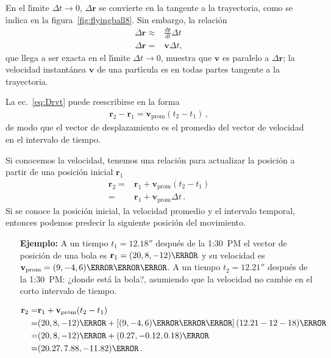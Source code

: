 En el l\'\i mite $\Delta t\to0$, $\Delta\mathbf{r}$ se convierte en la tangente a la trayectoria, como se \'\i ndica en la figura~\ref{fig:flyingball8}. Sin embargo, la relaci\'on
\begin{align}
  \label{eq:Drvt}
  \Delta\mathbf{r}\approx&\frac{d\mathbf{r}}{dt}\Delta t\nonumber\\
  \Delta\mathbf{r}=&\mathbf{v}\Delta t,
\end{align}
que llega a ser exacta en el l\'\i mite $\Delta t\to 0$, muestra que $\mathbf{v}$ es paralelo a $\Delta\mathbf{r}$; la velocidad instant\'anea $\mathbf{v}$ de una part\'\i cula es en todas partes tangente a la trayectoria. 


La ec.~\eqref{eq:Drvt} puede reescribirse en la forma
\begin{align*}
  \mathbf{r}_2-\mathbf{r}_1=\mathbf{v}_{\text{prom}}(t_2-t_1)\,,
\end{align*}
de modo que el vector de desplazamiento es el promedio del vector de velocidad en el intervalo de tiempo.

Si conocemos la velocidad, tenemos una relación para actualizar la posición a partir de una posición inicial $\mathbf{r}_1$
\begin{align*}
  \mathbf{r}_2=&\mathbf{r}_1+\mathbf{v}_{\text{prom}}(t_2-t_1)\nonumber\\
=&\mathbf{r}_1+\mathbf{v}_{\text{prom}}\Delta t\,.
\end{align*}
Si se conoce la posición inicial, la velocidad promedio y el intervalo temporal, entonces podemos predecir la siguiente posición del movimiento.
\begin{frame}[plain]
  \begin{itemize}
\item[\textbf{Ejemplo:}] A un tiempo $t_1=12.18\second$ después de la 1:30~PM el vector de posición de una bola es $\mathbf{r}_1=(20,8,-12)\meter$ y su velocidad es $\mathbf{v}_{\text{prom}}=(9,-4,6)\meter\per\second$. A un tiempo $t_2=12.21\second$ después de la 1:30~PM: ¿donde está la bola?, asumiendo que la velocidad no cambie en el corto intervalo de tiempo.

  
  \begin{align*}
  \mathbf{r}_2=&\mathbf{r}_1+\mathbf{v}_{\text{prom}}(t_2-t_1)\nonumber\\
  =&(20,8,-12)\meter +  \left[(9,-4,6)\meter\per\second\right](12.21-12-18)\second\nonumber\\
  =&(20,8,-12)\meter+(0.27,-0.12,0.18)\meter\nonumber\\
=&(20.27,7.88,-11.82)\meter\,.
  \end{align*}
\end{itemize}
\end{frame}

